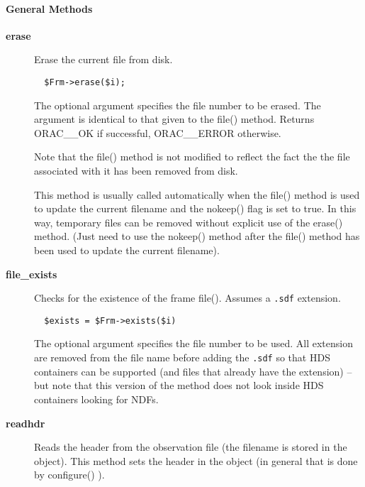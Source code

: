 \paragraph*{General Methods\label{ORAC::Frame::NDF_General_Methods}}\begin{description}
\item[\textbf{erase}] \mbox{}

Erase the current file from disk.

\begin{verbatim}
  $Frm->erase($i);
\end{verbatim}


The optional argument specifies the file number to be erased.
The argument is identical to that given to the file() method.
Returns ORAC\_\_OK if successful, ORAC\_\_ERROR otherwise.



Note that the file() method is not modified to reflect the
fact the the file associated with it has been removed from disk.



This method is usually called automatically when the file()
method is used to update the current filename and the nokeep()
flag is set to true. In this way, temporary files can be removed
without explicit use of the erase() method. (Just need to
use the nokeep() method after the file() method has been used
to update the current filename).

\item[\textbf{file\_exists}] \mbox{}

Checks for the existence of the frame file(). Assumes a \texttt{.sdf}
extension.

\begin{verbatim}
  $exists = $Frm->exists($i)
\end{verbatim}


The optional argument specifies the file number to be used.
All extension are removed from the file name before adding the
\texttt{.sdf} so that HDS containers can be supported (and files
that already have the extension)  -- but note that
this version of the method does not look inside HDS containers
looking for NDFs.

\item[\textbf{readhdr}] \mbox{}

Reads the header from the observation file (the filename is stored in
the object).  This method sets the header in the object (in general
that is done by configure() ).


\end{description}
